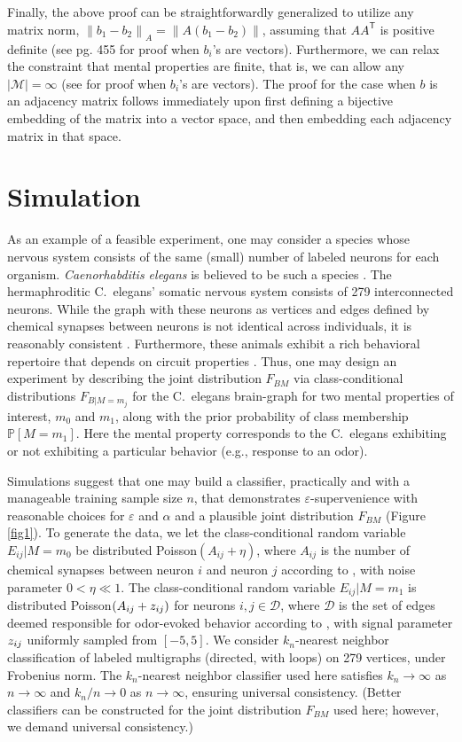 \documentclass{article}
\newcommand{\mD}{\mathcal{D}}
\newcommand{\mM}{\mathcal{M}}
\newcommand{\PP}{\mathbb{P}}           %
\providecommand{\tr}[1]{\textcolor{black}{#1}}
\providecommand{\norm}[1]{\left \lVert#1 \right  \rVert}
\newcommand{\T}{^{\ensuremath{\mathsf{T}}}}           %
\begin{document}
Finally, the above proof can be straightforwardly generalized to utilize any matrix norm, $\norm{b_1-b_2}_A=\norm{A(b_1-b_2)}$, assuming that $A A\T$ is positive definite (see \cite{DGL96} pg. 455 for proof when $b_i$'s are vectors).  Furthermore, we can relax the constraint that mental properties are finite, that is, we can allow any $|\mM| = \infty$ (see \cite{Stone77} for proof when $b_i$'s are vectors).  The proof for the case when $b$ is an adjacency matrix follows immediately upon first defining a bijective embedding of the matrix into a vector space, and then embedding each adjacency matrix in that space.  

\section{Simulation} \label{simulation}

As an example of a feasible experiment, one may consider a species whose nervous system consists of the same (small) number of labeled neurons for each organism. {\it Caenorhabditis elegans} is believed to be such a species \cite{Durbin87}. The hermaphroditic C.~elegans' somatic nervous system consists of 279 interconnected neurons. While the graph with these neurons as vertices and edges defined by chemical synapses between neurons is not identical across individuals, it is reasonably consistent \cite{Durbin87}. Furthermore, these animals exhibit a rich behavioral repertoire that depends on circuit properties \cite{deBonoMaricq05}. Thus, one may design an experiment by describing the joint distribution $F_{BM}$ via class-conditional distributions $F_{B|M=m_j}$ for the C.~elegans brain-graph for two mental properties of interest, $m_0$ and $m_1$, along with the prior probability of class membership $\PP[M=m_1]$. Here the mental property corresponds to the C.~elegans exhibiting or not exhibiting a particular behavior (e.g., response to an odor).

Simulations suggest that one may build a classifier, practically and with a manageable training sample size $n$, that demonstrates $\varepsilon$-supervenience with reasonable choices for $\varepsilon$ and $\alpha$ and a plausible joint distribution $F_{BM}$ (Figure \ref{fig1}). To generate the data, we let the class-conditional random variable $E_{ij} | M=m_0$ be distributed Poisson$(A_{ij}+\eta)$, where $A_{ij}$ is the number of chemical synapses between neuron $i$ and neuron $j$ according to \cite{VarshneyChklovskii09}, with noise parameter $0<\eta \ll 1$. The class-conditional random variable $E_{ij} | M=m_1$ is distributed Poisson$(A_{ij}+ \tr{z_{ij}})$ for neurons $i,j \in \mD$, where $\mD$ is the set of edges deemed responsible for odor-evoked behavior according to \cite{ChalasaniBargmann07}, with signal parameter $\tr{z_{ij}}$ uniformly sampled from $[-5,5]$. We consider $k_n$-nearest neighbor classification of labeled multigraphs (directed, with loops) on 279 vertices, under Frobenius norm. The $k_n$-nearest neighbor classifier used here satisfies $k_n \rightarrow \infty$ as $n \rightarrow \infty$ and $k_n/n \rightarrow 0$ as $n \rightarrow \infty$, ensuring universal consistency. (Better classifiers can be constructed for the joint distribution $F_{BM}$ used here; however, we demand universal consistency.)
\end{document}
